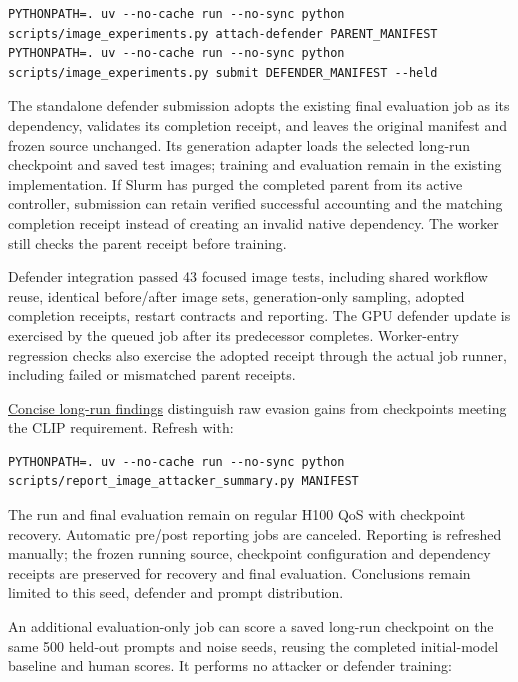 \begin{Verbatim}
PYTHONPATH=. uv --no-cache run --no-sync python scripts/image_experiments.py attach-defender PARENT_MANIFEST
PYTHONPATH=. uv --no-cache run --no-sync python scripts/image_experiments.py submit DEFENDER_MANIFEST --held
\end{Verbatim}

The standalone defender submission adopts the existing final evaluation
job as its dependency, validates its \texttt{}
completion receipt, and leaves the original manifest and frozen source
unchanged. Its generation adapter loads the selected long-run checkpoint
and saved test images; training and evaluation remain in the existing
implementation. If Slurm has purged the completed parent from its active
controller, submission can retain verified successful accounting and the
matching completion receipt instead of creating an invalid native
dependency. The worker still checks the parent receipt before training.

Defender integration passed 43 focused image tests, including shared
workflow reuse, identical before/after image sets, generation-only
sampling, adopted completion receipts, restart contracts and reporting.
The GPU defender update is exercised by the queued job after its
predecessor completes. Worker-entry regression checks also exercise the
adopted receipt through the actual job runner, including failed or
mismatched parent receipts.

\href{records/docs/image_attacker_ablation_summary.tex}{Concise long-run
findings} distinguish raw evasion gains from checkpoints meeting the
CLIP requirement. Refresh with:

\begin{Verbatim}
PYTHONPATH=. uv --no-cache run --no-sync python scripts/report_image_attacker_summary.py MANIFEST
\end{Verbatim}

The run and final evaluation remain on regular H100 QoS with checkpoint
recovery. Automatic pre/post reporting jobs are canceled. Reporting is
refreshed manually; the frozen running source, checkpoint configuration
and dependency receipts are preserved for recovery and final evaluation.
Conclusions remain limited to this seed, defender and prompt
distribution.

An additional evaluation-only job can score a saved long-run checkpoint
on the same 500 held-out prompts and noise seeds, reusing the completed
initial-model baseline and human scores. It performs no attacker or
defender training:

